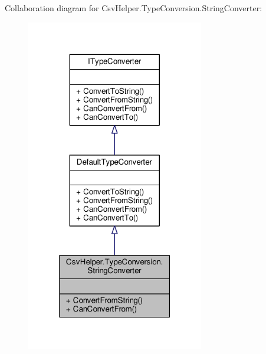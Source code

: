 Collaboration diagram for Csv\-Helper.\-Type\-Conversion.\-String\-Converter\-:
\nopagebreak
\begin{figure}[H]
\begin{center}
\leavevmode
\includegraphics[width=220pt]{db/dc4/a00495}
\end{center}
\end{figure}
